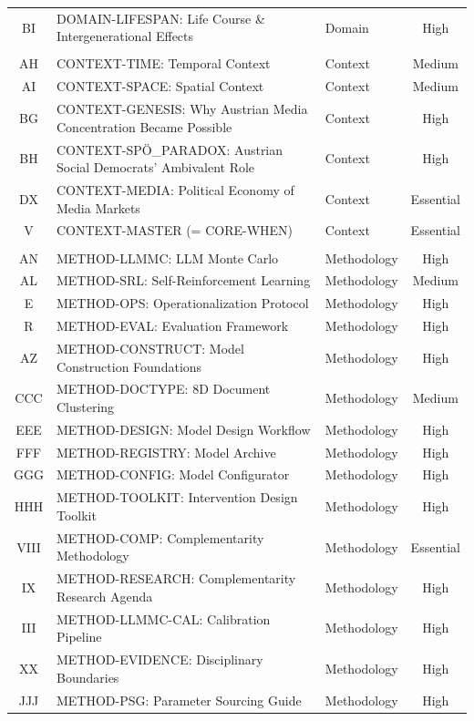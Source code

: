 \begin{table}[htbp]
\begin{tabular}{@{}cllc@{}}
BI & DOMAIN-LIFESPAN: Life Course \& Intergenerational Effects & Domain & High \\
\addlinespace
\multicolumn{4}{@{}l}{\textit{\textbf{CONTEXT (6)}}} \\
AH & CONTEXT-TIME: Temporal Context & Context & Medium \\
AI & CONTEXT-SPACE: Spatial Context & Context & Medium \\
BG & CONTEXT-GENESIS: Why Austrian Media Concentration Became Possible & Context & High \\
BH & CONTEXT-SPÖ_PARADOX: Austrian Social Democrats' Ambivalent Role & Context & High \\
DX & CONTEXT-MEDIA: Political Economy of Media Markets & Context & Essential \\
V & CONTEXT-MASTER (= CORE-WHEN) & Context & Essential \\
\addlinespace
\multicolumn{4}{@{}l}{\textit{\textbf{METHOD (14)}}} \\
AN & METHOD-LLMMC: LLM Monte Carlo & Methodology & High \\
AL & METHOD-SRL: Self-Reinforcement Learning & Methodology & Medium \\
E & METHOD-OPS: Operationalization Protocol & Methodology & High \\
R & METHOD-EVAL: Evaluation Framework & Methodology & High \\
AZ & METHOD-CONSTRUCT: Model Construction Foundations & Methodology & High \\
CCC & METHOD-DOCTYPE: 8D Document Clustering & Methodology & Medium \\
EEE & METHOD-DESIGN: Model Design Workflow & Methodology & High \\
FFF & METHOD-REGISTRY: Model Archive & Methodology & High \\
GGG & METHOD-CONFIG: Model Configurator & Methodology & High \\
HHH & METHOD-TOOLKIT: Intervention Design Toolkit & Methodology & High \\
VIII & METHOD-COMP: Complementarity Methodology & Methodology & Essential \\
IX & METHOD-RESEARCH: Complementarity Research Agenda & Methodology & High \\
III & METHOD-LLMMC-CAL: Calibration Pipeline & Methodology & High \\
XX & METHOD-EVIDENCE: Disciplinary Boundaries & Methodology & High \\
JJJ & METHOD-PSG: Parameter Sourcing Guide & Methodology & High \\

\end{tabular}
\end{table}
